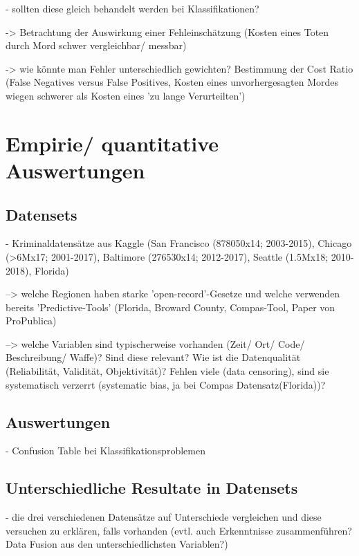 \documentclass[a4paper,12pt,parskip,bibtotoc,liststotoc]{article}
\begin{document}
- sollten diese gleich behandelt werden bei Klassifikationen?

-> Betrachtung der Auswirkung einer Fehleinschätzung (Kosten eines Toten durch Mord schwer vergleichbar/ messbar)

-> wie könnte man Fehler unterschiedlich gewichten? Bestimmung der Cost Ratio (False Negatives versus False Positives, Kosten eines unvorhergesagten Mordes wiegen schwerer als Kosten eines 'zu lange Verurteilten')




\newpage
\section{Empirie/ quantitative Auswertungen}

\subsection{Datensets}

- Kriminaldatensätze aus Kaggle (San Francisco (878050x14; 2003-2015), Chicago (>6Mx17; 2001-2017), Baltimore (276530x14; 2012-2017), Seattle (1.5Mx18; 2010-2018), Florida)



--> welche Regionen haben starke 'open-record'-Gesetze und welche verwenden bereits 'Predictive-Tools' (Florida,  Broward County, Compas-Tool, Paper von ProPublica)

--> welche Variablen sind typischerweise vorhanden (Zeit/ Ort/ Code/ Beschreibung/ Waffe)? Sind diese relevant? Wie ist die Datenqualität (Reliabilität, Validität, Objektivität)? Fehlen viele (data censoring), sind sie systematisch verzerrt (systematic bias, ja bei Compas Datensatz(Florida))?





\subsection{Auswertungen}  

- Confusion Table bei Klassifikationsproblemen

\subsection{Unterschiedliche Resultate in Datensets} 

- die drei verschiedenen Datensätze auf Unterschiede vergleichen und diese versuchen zu erklären, falls vorhanden (evtl. auch Erkenntnisse zusammenführen? Data Fusion aus den unterschiedlichsten Variablen?)
\end{document}
